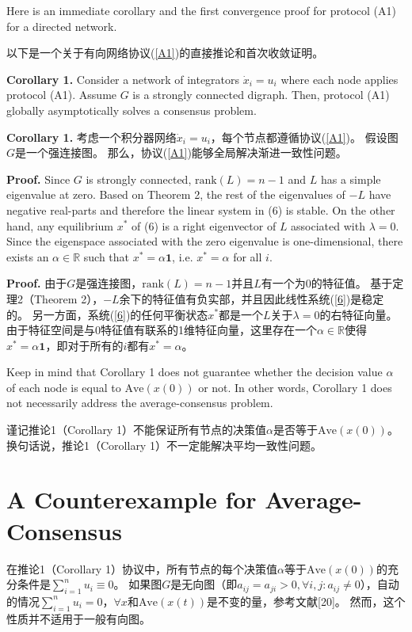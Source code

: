 \documentclass{article}
\begin{document}
{\color[gray]{0.5}
Here is an immediate corollary and the ﬁrst convergence proof for protocol (A1) for a directed network.
}

以下是一个关于有向网络协议(\ref{A1})的直接推论和首次收敛证明。

{\color[gray]{0.5}
\noindent \textbf{Corollary 1.} Consider a network of integrators $\dot{x}_i = u_i$ where each node applies protocol (A1). 
Assume $G$ is a strongly connected digraph. 
Then, protocol (A1) globally asymptotically solves a consensus problem.
}

\noindent \textbf{Corollary 1.} 考虑一个积分器网络$\dot{x}_i = u_i$，每个节点都遵循协议(\ref{A1})。
假设图$G$是一个强连接图。
那么，协议(\ref{A1})能够全局解决渐进一致性问题。

{\color[gray]{0.5}
\noindent \textbf{Proof.} Since $G$ is strongly connected, $\text{rank}(L)=n-1$ and $L$ has a simple eigenvalue at zero. 
Based on Theorem 2, the rest of the eigenvalues of $−L$ have negative real-parts and therefore the linear system in (6) is stable. 
On the other hand, any equilibrium $x^*$ of (6) is a right eigenvector of $L$ associated with $\lambda=0$. 
Since the eigenspace associated with the zero eigenvalue is one-dimensional, there exists an $\alpha\in \mathbb{R}$ such that $x^*=\alpha\mathbf{1}$, i.e. $x^*=\alpha$ for all $i$.
}

\noindent \textbf{Proof.} 由于$G$是强连接图，$\text{rank}(L)=n-1$并且$L$有一个为0的特征值。
基于定理2（Theorem 2），$-L$余下的特征值有负实部，并且因此线性系统(\ref{6})是稳定的。
另一方面，系统(\ref{6})的任何平衡状态$x^*$都是一个$L$关于$\lambda=0$的右特征向量。
由于特征空间是与0特征值有联系的1维特征向量，这里存在一个$\alpha\in \mathbb{R}$使得$x^*=\alpha\mathbf{1}$，即对于所有的$i$都有$x^*=\alpha$。

{\color[gray]{0.5}
Keep in mind that Corollary 1 does not guarantee whether the decision value $\alpha$ of each node is equal to $\text{Ave}(x(0))$ or not. 
In other words, Corollary 1 does not necessarily address the average-consensus problem.
}

谨记推论1（Corollary 1）不能保证所有节点的决策值$\alpha$是否等于$\text{Ave}(x(0))$。
换句话说，推论1（Corollary 1）不一定能解决平均一致性问题。


\section{A Counterexample for Average-Consensus}
在推论1（Corollary 1）协议中，所有节点的每个决策值$\alpha$等于$\text{Ave}(x(0))$的充分条件是$\sum_{i=1}^{n}u_i \equiv 0$。
如果图$G$是无向图（即$a_{ij}=a_{ji} > 0,\forall i,j: a_{ij}\ne 0$），自动的情况$\sum_{i=1}^{n}u_i=0$，$\forall x$和$\text{Ave}(x(t))$是不变的量，参考文献[20]。
然而，这个性质并不适用于一般有向图。
\end{document}
